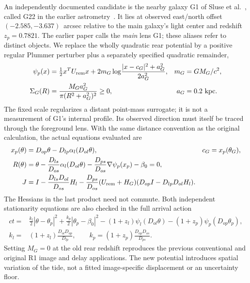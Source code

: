 An independently documented candidate is the nearby galaxy G1 of
Sluse et al.\ \cite{Sluse2017H0LiCOWII}, called G22 in the earlier
astrometry\ \cite{FadelyKeeton2012HE0435}. It lies at observed
east/north offset $(-2.585,-3.637)$~arcsec relative to the main galaxy's
light center and redshift $z_p=0.7821$. The earlier paper calls the
\emph{main} lens G1; these aliases refer to distinct objects.
We replace the wholly quadratic rear potential by a positive regular
Plummer perturber plus a separately specified quadratic remainder,
\begin{align}
 \psi_p(x)&=\tfrac12 x^T U_{\rm rem}x+
  2m_G\log\!\frac{|x-c_G|^2+a_G^2}{2a_G^2},
 &m_G&=GM_G/c^2,\label{eq:he0435-g1-potential}\\
 \Sigma_G(R)&=\frac{M_Ga_G^2}{\pi(R^2+a_G^2)^2}\geq0,
 &a_G&=0.2~\mathrm{kpc}.
\end{align}
The fixed scale regularizes a distant point-mass surrogate; it is not a
measurement of G1's internal profile. Its observed direction must itself
be traced through the foreground lens. With the same distance convention
as the original calculation, the actual equations evaluated are
\begin{align}
 x_p(\theta)&=D_{op}\theta-D_{lp}\alpha_l(D_{ol}\theta),
 &c_G&=x_p(\theta_G),\label{eq:he0435-g1-raycenter}\\
 R(\theta)&=\theta-\frac{D_{ls}}{D_{os}}\alpha_l(D_{ol}\theta)
 -\frac{D_{ps}}{D_{os}}\nabla\psi_p(x_p)-\beta_0=0,
 \label{eq:he0435-full-two-plane-ray}\\
 J&=I-\frac{D_{ls}D_{ol}}{D_{os}}H_l
 -\frac{D_{ps}}{D_{os}}(U_{\rm rem}+H_G)
       (D_{op}I-D_{lp}D_{ol}H_l).
 \label{eq:he0435-ordered-two-plane-jacobian}
\end{align}
The Hessians in the last product need not commute. Both independent
stationarity equations are also checked in the full arrival action
\begin{align}
 ct={}&\frac{k_l}{2}|\theta-\theta_p|^2
       +\frac{k_p}{2}|\theta_p-\beta_0|^2
       -(1+z_l)\psi_l(D_{ol}\theta)
       -(1+z_p)\psi_p(D_{op}\theta_p),\nonumber\\
 k_l={}&(1+z_l)\frac{D_{ol}D_{op}}{D_{lp}},
 \qquad k_p=(1+z_p)\frac{D_{op}D_{os}}{D_{ps}}.
 \label{eq:he0435-full-two-plane-action}
\end{align}
Setting $M_G=0$ at the old rear redshift reproduces the previous
conventional and original R1 image and delay applications. The new
potential introduces spatial variation of the tide, not a fitted
image-specific displacement or an uncertainty floor.


